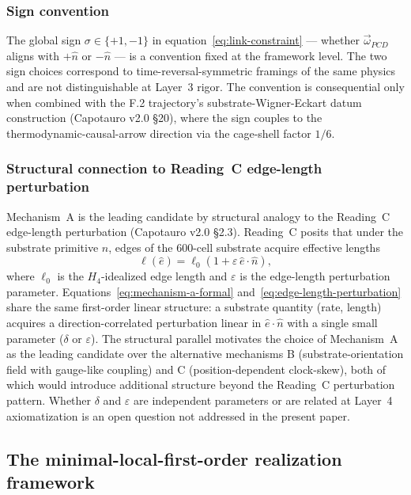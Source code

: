 \documentclass[11pt,letterpaper]{article}
\newcommand{\omegaPCD}{\vec{\omega}_{PCD}}
\begin{document}
\subsubsection*{Sign convention}

The global sign $\sigma \in \{+1, -1\}$ in equation~\eqref{eq:link-constraint} --- whether $\omegaPCD$ aligns with $+\hat{n}$ or $-\hat{n}$ --- is a convention fixed at the framework level. The two sign choices correspond to time-reversal-symmetric framings of the same physics and are not distinguishable at Layer~3 rigor. The convention is consequential only when combined with the F.2 trajectory's substrate-Wigner-Eckart datum construction (Capotauro v2.0 \S20), where the sign couples to the thermodynamic-causal-arrow direction via the cage-shell factor $1/6$.

\subsubsection*{Structural connection to Reading~C edge-length perturbation}

Mechanism~A is the leading candidate by structural analogy to the Reading~C edge-length perturbation (Capotauro v2.0 \S2.3). Reading~C posits that under the substrate primitive $\hat{n}$, edges of the 600-cell substrate acquire effective lengths
\begin{equation}
\ell(\hat{e}) = \ell_0 \left(1 + \varepsilon \, \hat{e} \cdot \hat{n}\right),
\label{eq:edge-length-perturbation}
\end{equation}
where $\ell_0$ is the $H_4$-idealized edge length and $\varepsilon$ is the edge-length perturbation parameter. Equations~\eqref{eq:mechanism-a-formal} and~\eqref{eq:edge-length-perturbation} share the same first-order linear structure: a substrate quantity (rate, length) acquires a direction-correlated perturbation linear in $\hat{e} \cdot \hat{n}$ with a single small parameter ($\delta$ or $\varepsilon$). The structural parallel motivates the choice of Mechanism~A as the leading candidate over the alternative mechanisms B (substrate-orientation field with gauge-like coupling) and C (position-dependent clock-skew), both of which would introduce additional structure beyond the Reading~C perturbation pattern. Whether $\delta$ and $\varepsilon$ are independent parameters or are related at Layer~4 axiomatization is an open question not addressed in the present paper.

\subsection{The minimal-local-first-order realization framework}
\label{sec:minimal-local-first-order}
\end{document}

